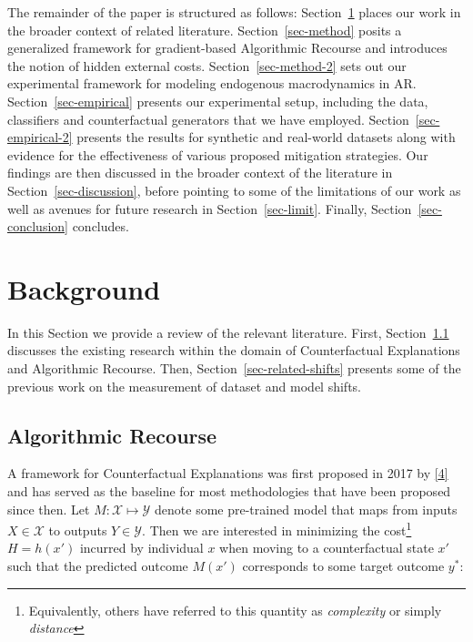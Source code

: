 \documentclass[
  conference]{IEEEtran}
\begin{document}
The remainder of the paper is structured as follows:
Section~\ref{sec-related} places our work in the broader context of
related literature. Section~\ref{sec-method} posits a generalized
framework for gradient-based Algorithmic Recourse and introduces the
notion of hidden external costs. Section~\ref{sec-method-2} sets out our
experimental framework for modeling endogenous macrodynamics in AR.
Section~\ref{sec-empirical} presents our experimental setup, including
the data, classifiers and counterfactual generators that we have
employed. Section~\ref{sec-empirical-2} presents the results for
synthetic and real-world datasets along with evidence for the
effectiveness of various proposed mitigation strategies. Our findings
are then discussed in the broader context of the literature in
Section~\ref{sec-discussion}, before pointing to some of the limitations
of our work as well as avenues for future research in
Section~\ref{sec-limit}. Finally, Section~\ref{sec-conclusion}
concludes.

\hypertarget{sec-related}{%
\section{Background}\label{sec-related}}

In this Section we provide a review of the relevant literature. First,
Section~\ref{sec-related-recourse} discusses the existing research
within the domain of Counterfactual Explanations and Algorithmic
Recourse. Then, Section~\ref{sec-related-shifts} presents some of the
previous work on the measurement of dataset and model shifts.

\hypertarget{sec-related-recourse}{%
\subsection{Algorithmic Recourse}\label{sec-related-recourse}}

A framework for Counterfactual Explanations was first proposed in 2017
by \protect\hyperlink{ref-wachter2017counterfactual}{{[}4{]}} and has
served as the baseline for most methodologies that have been proposed
since then. Let \(M: \mathcal{X} \mapsto \mathcal{Y}\) denote some
pre-trained model that maps from inputs \(X \in \mathcal{X}\) to outputs
\(Y \in \mathcal{Y}\). Then we are interested in minimizing the
cost\footnote{Equivalently, others have referred to this quantity as
  \emph{complexity} or simply \emph{distance}} \(H=h(x\prime)\) incurred
by individual \(x\) when moving to a counterfactual state \(x\prime\)
such that the predicted outcome \(M(x\prime)\) corresponds to some
target outcome \(y^*\):
\end{document}
